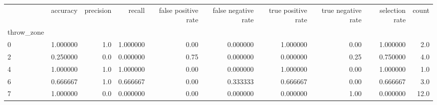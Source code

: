 \begin{tabular}{lrrrrrrrrr}
\toprule
{} &  accuracy &  precision &    recall &  false positive rate &  false negative rate &  true positive rate &  true negative rate &  selection rate &  count \\
throw\_zone &           &            &           &                      &                      &                     &                     &                 &        \\
\midrule
0          &  1.000000 &        1.0 &  1.000000 &                 0.00 &             0.000000 &            1.000000 &                0.00 &        1.000000 &    2.0 \\
2          &  0.250000 &        0.0 &  0.000000 &                 0.75 &             0.000000 &            0.000000 &                0.25 &        0.750000 &    4.0 \\
4          &  1.000000 &        1.0 &  1.000000 &                 0.00 &             0.000000 &            1.000000 &                0.00 &        1.000000 &    1.0 \\
6          &  0.666667 &        1.0 &  0.666667 &                 0.00 &             0.333333 &            0.666667 &                0.00 &        0.666667 &    3.0 \\
7          &  1.000000 &        0.0 &  0.000000 &                 0.00 &             0.000000 &            0.000000 &                1.00 &        0.000000 &   12.0 \\
\bottomrule
\end{tabular}
